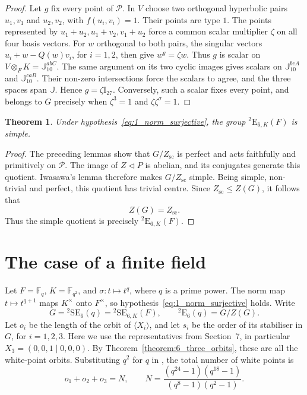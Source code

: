 \documentclass{amsart}
\def\II{\mathord{\mathrm{I}}}
\newcommand{\Fq}{\mathbb{F}_q}
\newcommand{\Fqs}{\mathbb{F}_{q^2}}
\newcommand{\SE}{\mathrm{SE}}
\newcommand{\E}{\mathrm{E}}
\newcommand{\J}{\mathbb{J}}
\newcommand{\s}{\sigma}
\theoremstyle{plain}
\newtheorem{theorem}{Theorem}
\numberwithin{theorem}{section}
\theoremstyle{definition}
\begin{document}
\begin{proof}
    Let $g$ fix every point of $\mathcal P$.
    In $V$ choose two orthogonal hyperbolic pairs $u_1,v_1$ and $u_2,v_2$,
    with $f(u_i,v_i)=1$. Their points are type $1$.
    The points represented by $u_1+u_2,u_1+v_2,v_1+u_2$ force a common
    scalar multiplier $\zeta$ on all four basis vectors.
    For $w$ orthogonal to both pairs, the singular vectors
    $u_i+w-Q(w)v_i$, for $i=1,2$, then give $w^g=\zeta w$.
    Thus $g$ is scalar on $V\otimes_F K=\J_{10}^{abC}$.
    The same argument on its two cyclic images gives scalars on
    $\J_{10}^{bcA}$ and $\J_{10}^{caB}$.
    Their non-zero intersections force the scalars to agree, and the
    three spaces span $\J$. Hence $g=\zeta\II_{27}$.
    Conversely, such a scalar fixes every point, and belongs to $G$
    precisely when $\zeta^3=1$ and $\zeta\zeta^\s=1$.
\end{proof}

\begin{theorem}
    \label{theorem:simplicity}
    Under hypothesis~\eqref{eq:1_norm_surjective}, the group
    ${}^2\E_{6,K}(F)$ is simple.
\end{theorem}

\begin{proof}
    The preceding lemmas show that $G/Z_{\mathrm{sc}}$ is perfect and
    acts faithfully and primitively on $\mathcal P$.
    The image of $Z\lhd P$ is abelian, and its conjugates generate this
    quotient. Iwasawa's lemma therefore makes $G/Z_{\mathrm{sc}}$ simple.
    Being simple, non-trivial and perfect, this quotient has trivial centre.
    Since $Z_{\mathrm{sc}}\leqslant Z(G)$, it follows that
    \begin{equation}
        \label{eq:simplicity_centre}
        Z(G)=Z_{\mathrm{sc}}.
    \end{equation}
    Thus the simple quotient is precisely ${}^2\E_{6,K}(F)$.
\end{proof}

\section{The case of a finite field}

Let $F=\Fq$, $K=\Fqs$, and $\s:t\mapsto t^q$, where $q$ is a prime
power.  The norm map $t\mapsto t^{q+1}$ maps $K^{\times}$ onto
$F^{\times}$, so hypothesis~\eqref{eq:1_norm_surjective} holds.
Write
\[
    G={}^2\SE_6(q)={}^2\SE_{6,K}(F),\qquad
    {}^2\E_6(q)=G/Z(G).
\]
Let $o_i$ be the length of the orbit of $\langle X_i\rangle$, and let
$s_i$ be the order of its stabiliser in $G$, for $i=1,2,3$.  Here we use
the representatives from Section~7, in particular
$X_3=(0,0,1\mid0,0,0)$.  By Theorem~\ref{theorem:6_three_orbits}, these
are all the white-point orbits.  Substituting $q^2$ for $q$ in
\cite[Corollary~8.2]{BSW1}, the total number of white points is
\begin{equation}
    \label{eq:8_white_points}
    o_1+o_2+o_3=N,\qquad
    N=\frac{(q^{24}-1)(q^{18}-1)}{(q^8-1)(q^2-1)}.
\end{equation}
\end{document}
